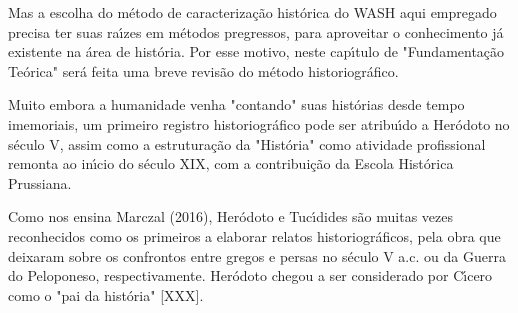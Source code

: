 \documentclass[
12pt,		%
openright,	%
twoside,  %
a4paper,			%
chapter=TITLE,		%
english,			%
french,				%
spanish,			%
brazil				%
]{USPSC-classe/USPSC}
\begin{document}
Mas a escolha do m\'etodo de caracteriza\c{c}\~ao hist\'orica do WASH aqui empregado precisa ter suas ra\'{\i}zes em m\'etodos pregressos, para aproveitar o conhecimento j\'a existente na \'area de hist\'oria. Por esse motivo, neste cap\'{\i}tulo de "Fundamenta\c{c}\~ao Te\'orica" ser\'a feita uma breve revis\~ao do m\'etodo historiogr\'afico.


Muito embora a humanidade venha "contando" suas hist\'orias desde tempo imemoriais, um primeiro registro historiogr\'afico pode ser atribu\'{\i}do a Her\'odoto no s\'eculo V, assim como a estrutura\c{c}\~ao da "Hist\'oria" como atividade profissional remonta ao in\'{\i}cio do s\'eculo XIX, com a contribui\c{c}\~ao da Escola Hist\'orica Prussiana.


Como nos ensina  Marczal (2016),  Her\'odoto e Tuc\'{\i}dides s\~ao muitas vezes reconhecidos como os primeiros a elaborar relatos historiogr\'aficos, pela obra que deixaram sobre os confrontos entre gregos e persas no s\'eculo V a.c. ou da Guerra do Peloponeso, respectivamente. Her\'odoto chegou a ser considerado por C\'{\i}cero como o "pai da hist\'oria" [XXX].
\end{document}
